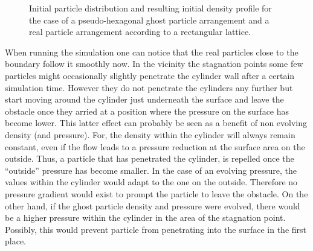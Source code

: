 \documentclass{report}
\begin{document}
\begin{figure}[!htbp]
\centering
\label{fig:PorosResultsCylinder_prtlDiscontinuity_reglatice_pseudoHex}

\caption[Initial situation for cylinder porosities]{Initial particle distribution   and resulting initial density profile  for the case of a pseudo-hexagonal ghost particle arrangement and a real particle arrangement according to a rectangular lattice.}
\end{figure}


When running the simulation one can notice that the real particles close to the boundary follow it smoothly now. In the vicinity the stagnation points some few particles might occasionally slightly penetrate the cylinder wall after a certain simulation time. However they do not penetrate the cylinders any further but start moving around the cylinder just underneath the surface and leave the obstacle once they arried at a position where the pressure on the surface has become lower.
This latter effect can probably be seen as a benefit of non evolving density (and pressure). For, the density within the cylinder will always remain constant, even if the flow leads to a pressure reduction at the surface area on the outside. Thus, a particle that has penetrated the cylinder, is repelled once the ``outside'' pressure has become smaller. In the case of an evolving pressure, the values within the cylinder would adapt to the one on the outside. Therefore no pressure gradient would exist to prompt the particle to leave the obstacle. 
On the other hand, if the ghost particle density and pressure were evolved, there would be a higher pressure within the cylinder in the area of the stagnation point. Possibly, this would prevent particle from penetrating into the surface in the first place.
\end{document}
